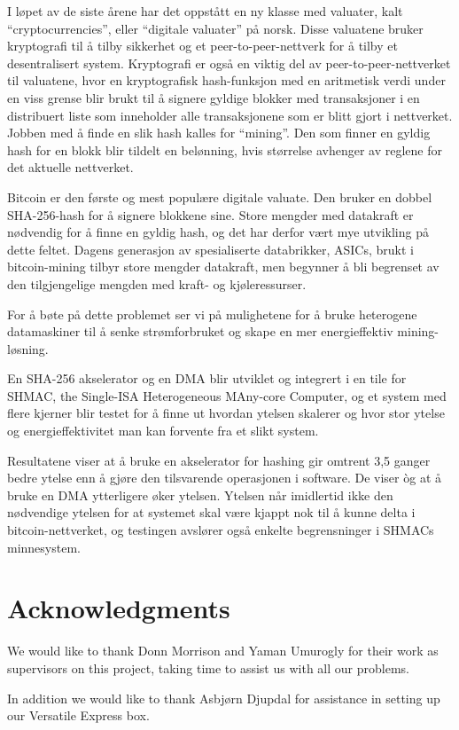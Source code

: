 I løpet av de siste årene har det oppstått en ny klasse med valuater,
kalt ``cryptocurrencies'', eller ``digitale valuater'' på norsk. Disse
valuatene bruker kryptografi til å tilby sikkerhet og et peer-to-peer-nettverk
for å tilby et desentralisert system. Kryptografi er også en viktig del av
peer-to-peer-nettverket til valuatene, hvor en kryptografisk hash-funksjon
med en aritmetisk verdi under en viss grense blir brukt til å signere
gyldige blokker med transaksjoner i en distribuert liste som inneholder
alle transaksjonene som er blitt gjort i nettverket. Jobben med å finde
en slik hash kalles for ``mining''. Den som finner en gyldig hash for en
blokk blir tildelt en belønning, hvis størrelse avhenger av reglene for
det aktuelle nettverket.

Bitcoin er den første og mest populære digitale valuate. Den bruker en
dobbel SHA-256-hash for å signere blokkene sine. Store mengder med
datakraft er nødvendig for å finne en gyldig hash, og det har derfor
vært mye utvikling på dette feltet. Dagens generasjon av spesialiserte
databrikker, ASICs, brukt i bitcoin-mining tilbyr store mengder
datakraft, men begynner å bli begrenset av den tilgjengelige mengden
med kraft- og kjøleressurser.

For å bøte på dette problemet ser vi på mulighetene for å bruke heterogene
datamaskiner til å senke strømforbruket og skape en mer energieffektiv
mining-løsning.

En SHA-256 akselerator og en DMA blir utviklet og integrert i en tile
for SHMAC, the Single-ISA Heterogeneous MAny-core Computer, og et system
med flere kjerner blir testet for å finne ut hvordan ytelsen skalerer
og hvor stor ytelse og energieffektivitet man kan forvente fra et slikt system.


Resultatene viser at å bruke en akselerator for hashing gir omtrent 3,5 ganger
bedre ytelse enn å gjøre den tilsvarende operasjonen i software. De viser òg
at å bruke en DMA ytterligere øker ytelsen. Ytelsen når imidlertid ikke den
nødvendige ytelsen for at systemet skal være kjappt nok til å kunne delta
i bitcoin-nettverket, og testingen avslører også enkelte begrensninger i
SHMACs minnesystem.

\chapter*{Acknowledgments}


We would like to thank Donn Morrison and Yaman Umurogly for their work as
supervisors on this project, taking time to assist us with all our problems.

In addition we would like to thank Asbjørn Djupdal for assistance in setting
up our Versatile Express box.

